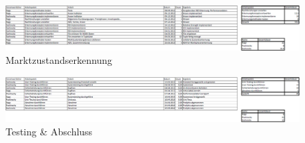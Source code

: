 \begin{figure}
	\centering
		\includegraphics[width=1.0\textheight, angle=90]{graphics/appendix/marktzustandserkennung.PNG}
	\caption{Marktzustandserkennung}
\end{figure}

\begin{figure}
	\centering
		\includegraphics[width=1.0\textheight, angle=90]{graphics/appendix/testingabschluss.PNG}
	\caption{Testing \& Abschluss}
\end{figure}

